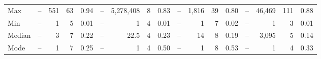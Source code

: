 \documentclass{IEEEtran}
\begin{document}
\begin{table}[h]
{\begin{tabular}{l|r|r|r|r|r|r|r|r|r|r|r|r|r|r|r|r}
		Max & -- & 551 & 63 & 0.94 & -- & 5,278,408 & 8 & 0.83 & -- & 1,816 & 39 & 0.80 & -- & 46,469 & 111 & 0.88\\ %
		Min & -- & 1 & 5 & 0.01 & -- & 1 & 4 & 0.01 & -- & 1 & 7 & 0.02 & -- & 1 & 3 & 0.01 \\ %
		Median & -- & 3 & 7 & 0.22 & -- & 22.5 & 4 & 0.23 & -- & 14 & 8 & 0.19 & -- & 3,095 & 5 & 0.14 \\ %
		Mode & -- & 1 & 7 & 0.25 & -- & 1 & 4 & 0.50 & -- & 1 & 8 & 0.53 & -- & 1 & 4 & 0.33 \\ %
		\hline
	\end{tabular} %
}
\end{table}
\end{document}
